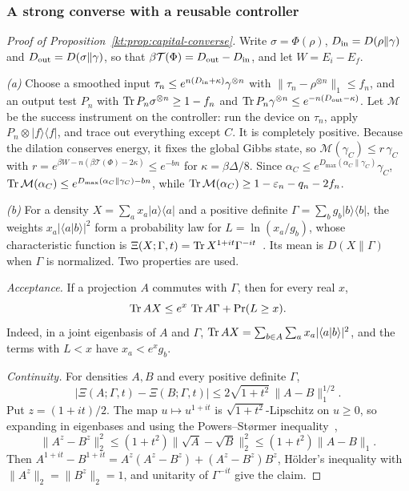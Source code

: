 \subsubsection{A strong converse with a reusable controller}\label{kt:pf:capital}

\begin{proof}[Proof of Proposition~\ref{kt:prop:capital-converse}]
Write $\sigma=\Phi(\rho)$, $D_{\rm in}=D(\rho\|\gamma)$ and $D_{\rm out}=D(\sigma\|\gamma)$, so that $\beta\mathcal T(\Phi)=D_{\rm out}-D_{\rm in}$, and let $W=E_i-E_f$.

\emph{(a)} Choose a smoothed input $\tau_n\le e^{n(D_{\rm in}+\kappa)}\gamma^{\otimes n}$ with $\|\tau_n-\rho^{\otimes n}\|_1\le f_n$, and an output test $P_n$ with $\operatorname{Tr} P_n\sigma^{\otimes n}\ge1-f_n$ and $\operatorname{Tr} P_n\gamma^{\otimes n}\le e^{-n(D_{\rm out}-\kappa)}$. Let $\mathcal M$ be the success instrument on the controller: run the device on $\tau_n$, apply $P_n\otimes|f\rangle\langle f|$, and trace out everything except $C$. It is completely positive. Because the dilation conserves energy, it fixes the global Gibbs state, so $\mathcal M(\gamma_C)\le r\,\gamma_C$ with $r=e^{\beta W-n(\beta\mathcal T(\Phi)-2\kappa)}\le e^{-bn}$ for $\kappa=\beta\Delta/8$. Since $\alpha_C\le e^{D_{\max}(\alpha_C\|\gamma_C)}\gamma_C$, $\operatorname{Tr}\mathcal M(\alpha_C)\le e^{D_{\max}(\alpha_C\|\gamma_C)-bn}$, while $\operatorname{Tr}\mathcal M(\alpha_C)\ge1-\varepsilon_n-q_n-2f_n$.

\emph{(b)} For a density $X=\sum_ax_a|a\rangle\langle a|$ and a positive definite $\Gamma=\sum_bg_b|b\rangle\langle b|$, the weights $x_a|\langle a|b\rangle|^2$ form a probability law for $L=\ln(x_a/g_b)$, whose characteristic function is $\Xi(X;\Gamma,t)=\operatorname{Tr} X^{1+it}\Gamma^{-it}$~\cite{NussbaumSzkola09}. Its mean is $D(X\|\Gamma)$ when $\Gamma$ is normalized. Two properties are used.

\emph{Acceptance.} If a projection $A$ commutes with $\Gamma$, then for every real $x$,
\begin{equation}\label{kt:eq:accept}
\operatorname{Tr} AX\le e^x\,\operatorname{Tr} A\Gamma+\Pr(L\ge x).
\end{equation}
Indeed, in a joint eigenbasis of $A$ and $\Gamma$, $\operatorname{Tr} AX=\sum_{b\in A}\sum_ax_a|\langle a|b\rangle|^2$, and the terms with $L<x$ have $x_a<e^xg_b$.

\emph{Continuity.} For densities $A,B$ and every positive definite $\Gamma$,
\[
|\Xi(A;\Gamma,t)-\Xi(B;\Gamma,t)|\le2\sqrt{1+t^2}\,\|A-B\|_1^{1/2}.
\]
Put $z=(1+it)/2$. The map $u\mapsto u^{1+it}$ is $\sqrt{1+t^2}$-Lipschitz on $u\ge0$, so expanding in eigenbases and using the Powers--St{\o}rmer inequality~\cite{PowersStormer70},
\[
\|A^z-B^z\|_2^2\le(1+t^2)\|\sqrt A-\sqrt B\|_2^2\le(1+t^2)\|A-B\|_1.
\] Then $A^{1+it}-B^{1+it}=A^z(A^z-B^z)+(A^z-B^z)B^z$, H\"older's inequality with $\|A^z\|_2=\|B^z\|_2=1$, and unitarity of $\Gamma^{-it}$ give the claim.


\end{proof}
